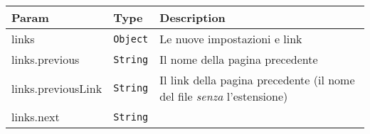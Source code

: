 \begin{tabularx}{\textwidth}{XXX}
\toprule
\begin{minipage}[b]{0.30\columnwidth}\raggedright
Param\strut
\end{minipage} & \begin{minipage}[b]{0.30\columnwidth}\raggedright
Type\strut
\end{minipage} & \begin{minipage}[b]{0.30\columnwidth}\raggedright
Description\strut
\end{minipage}\tabularnewline
\midrule
\endhead
\begin{minipage}[t]{0.30\columnwidth}\raggedright
links\strut
\end{minipage} & \begin{minipage}[t]{0.30\columnwidth}\raggedright
\texttt{Object}\strut
\end{minipage} & \begin{minipage}[t]{0.30\columnwidth}\raggedright
Le nuove impostazioni e link\strut
\end{minipage}\tabularnewline
\begin{minipage}[t]{0.30\columnwidth}\raggedright
links.previous\strut
\end{minipage} & \begin{minipage}[t]{0.30\columnwidth}\raggedright
\texttt{String}\strut
\end{minipage} & \begin{minipage}[t]{0.30\columnwidth}\raggedright
Il nome della pagina precedente\strut
\end{minipage}\tabularnewline
\begin{minipage}[t]{0.30\columnwidth}\raggedright
links.previousLink\strut
\end{minipage} & \begin{minipage}[t]{0.30\columnwidth}\raggedright
\texttt{String}\strut
\end{minipage} & \begin{minipage}[t]{0.30\columnwidth}\raggedright
Il link della pagina precedente (il nome del file \emph{senza}
l'estensione)\strut
\end{minipage}\tabularnewline
\begin{minipage}[t]{0.30\columnwidth}\raggedright
links.next\strut
\end{minipage} & \begin{minipage}[t]{0.30\columnwidth}\raggedright
\texttt{String}\strut
\end{minipage} & \begin{minipage}[t]{0.30\columnwidth}\raggedright

\end{minipage}
\end{tabularx}

